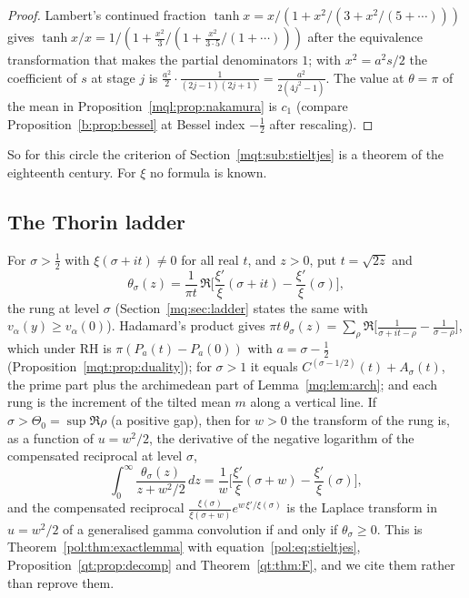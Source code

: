 \begin{proof}
Lambert's continued fraction $\tanh x=x/(1+x^2/(3+x^2/(5+\cdots)))$ gives $\tanh x/x=1/(1+\frac{x^2}3/(1+\frac{x^2}{3\cdot5}/(1+\cdots)))$ after the equivalence transformation that makes the partial denominators $1$; with $x^2=a^2s/2$ the coefficient of $s$ at stage $j$ is $\frac{a^2}2\cdot\frac1{(2j-1)(2j+1)}=\frac{a^2}{2(4j^2-1)}$. The value at $\theta=\pi$ of the mean in Proposition~\ref{mql:prop:nakamura} is $c_1$ (compare Proposition~\ref{b:prop:bessel} at Bessel index $-\frac12$ after rescaling).
\end{proof}

So for this circle the criterion of Section~\ref{mqt:sub:stieltjes} is a theorem of the eighteenth century. For $\xi$ no formula is known.

\subsection{The Thorin ladder}\label{mqt:sub:ladder}

For $\sigma>\frac12$ with $\xi(\sigma+it)\ne0$ for all real $t$, and $z>0$, put $t=\sqrt{2z}$ and
\[
\theta_\sigma(z)=\frac1{\pi t}\,\Re\Big[\frac{\xi'}\xi(\sigma+it)-\frac{\xi'}\xi(\sigma)\Big],
\]
the rung at level $\sigma$ (Section~\ref{mq:sec:ladder} states the same with $v_\alpha(y)\ge v_\alpha(0)$). Hadamard's product gives $\pi t\,\theta_\sigma(z)=\sum_\rho\Re\big[\frac1{\sigma+it-\rho}-\frac1{\sigma-\rho}\big]$, which under RH is $\pi(P_a(t)-P_a(0))$ with $a=\sigma-\frac12$ (Proposition~\ref{mqt:prop:duality}); for $\sigma>1$ it equals $C^{(\sigma-1/2)}(t)+A_\sigma(t)$, the prime part plus the archimedean part of Lemma~\ref{mq:lem:arch}; and each rung is the increment of the tilted mean $m$ along a vertical line. If $\sigma>\Theta_0=\sup\Re\rho$ (a positive gap), then for $w>0$ the transform of the rung is, as a function of $u=w^2/2$, the derivative of the negative logarithm of the compensated reciprocal at level $\sigma$,
\[
\int_0^\infty\frac{\theta_\sigma(z)}{z+w^2/2}\,dz=\frac1w\Big[\frac{\xi'}\xi(\sigma+w)-\frac{\xi'}\xi(\sigma)\Big],
\]
and the compensated reciprocal $\frac{\xi(\sigma)}{\xi(\sigma+w)}e^{w\,\xi'/\xi(\sigma)}$ is the Laplace transform in $u=w^2/2$ of a generalised gamma convolution if and only if $\theta_\sigma\ge0$. This is Theorem~\ref{pol:thm:exactlemma} with equation~\eqref{pol:eq:stieltjes}, Proposition~\ref{qt:prop:decomp} and Theorem~\ref{qt:thm:F}, and we cite them rather than reprove them.

